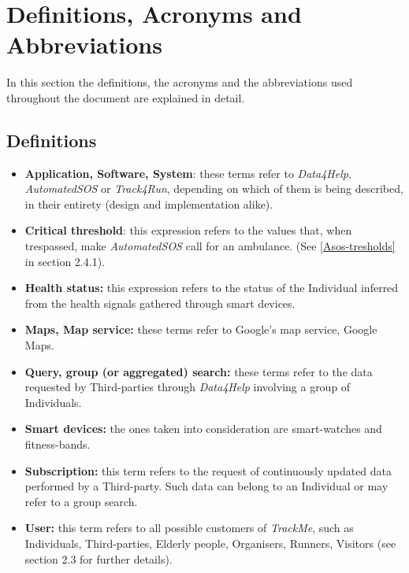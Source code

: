 \section{Definitions, Acronyms and Abbreviations}
    In this section the definitions, the acronyms and the abbreviations used throughout the document are explained in detail.
    
    \subsection{Definitions}
        \begin{itemize}
            \item \textbf{Application, Software, System}: these terms refer to \emph{Data4Help}, \emph{AutomatedSOS} or \emph{Track4Run}, depending on which of them is being described, in their entirety (design and implementation alike).
            
            \item \textbf{Critical threshold}: this expression refers to the values that, when trespassed, make \emph{AutomatedSOS} call for an ambulance. (See \ref{Asos-tresholds} in section 2.4.1). 
            
            \item \textbf{Health status:} this expression refers to the status of the Individual inferred from the health signals gathered through smart devices.
            
            \item \textbf{Maps, Map service:} these terms refer to Google's map service, Google Maps.
            
            \item \textbf{Query, group (or aggregated) search:} these terms refer to the data requested by Third-parties through \emph{Data4Help} involving a group of Individuals.
            
            \item \textbf{Smart devices:} the ones taken into consideration are smart-watches and fitness-bands.
            
            \item \textbf{Subscription:} this term refers to the request of continuously updated data performed by a Third-party. Such data can belong to an Individual or may refer to a group search.
                        
            \item \textbf{User:} this term refers to all possible customers of \emph{TrackMe}, such as Individuals, Third-parties, Elderly people, Organisers, Runners, Visitors (see section 2.3 for further details).
            

\end{itemize}
